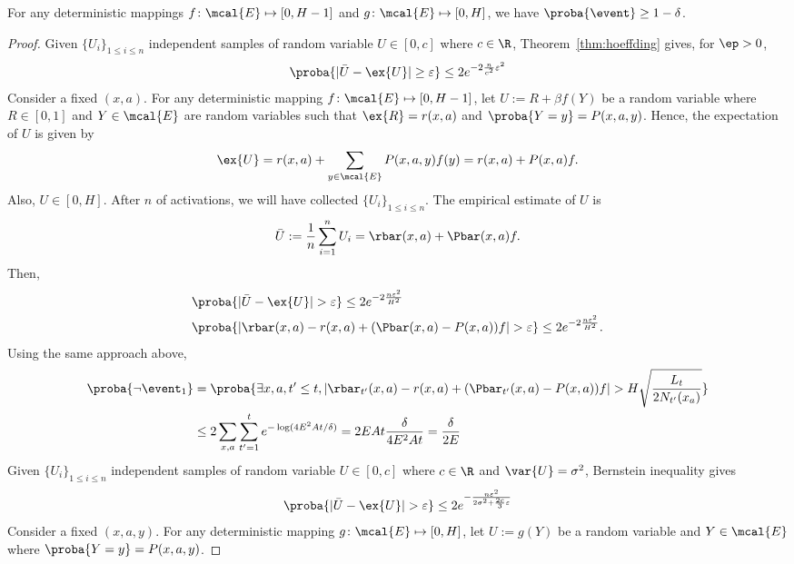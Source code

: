 \begin{lemma}
\label{lem:high_prob}
For any deterministic mappings $f\colon \mcal{E}\mapsto[0,H-1]$ and $g\colon \mcal{E}\mapsto[0,H]$, we have $\proba{\event}\ge1-\delta$.
\end{lemma}
\begin{proof}
Given $\{U_i\}_{1\le i\le n}$ independent samples of random variable $U\in[0, c]$ where $c\in\R$, Theorem~\ref{thm:hoeffding} gives, for $\ep>0$,
\begin{align*}
\proba{|\bar{U}-\ex{U}|\ge \varepsilon} \le 2e^{-2\frac{n}{c^2}\varepsilon^2}
\end{align*}
Consider a fixed $(x,a)$.
For any deterministic mapping $f\colon\mcal{E}\mapsto[0,H-1]$, let $U:=R+\beta f(Y)$ be a random variable where $R\in[0,1]$ and $Y\in\mcal{E}$ are random variables such that $\ex{R}=r(x,a)$ and $\proba{Y=y}=P(x,a,y)$.
Hence, the expectation of $U$ is given by 
\begin{align*}
\ex{U}=r(x,a) +\sum_{y\in\mcal{E}}P(x,a,y)f(y)=r(x,a) +P(x,a)f.
\end{align*}
Also, $U\in [0,H]$.
After $n$ of activations, we will have collected $\{U_i\}_{1\le i\le n}$.
The empirical estimate of $U$ is
$$\bar{U}:=\frac1n\sum_{i=1}^{n} U_i=\rbar(x,a) +\Pbar(x,a)f.$$
Then,
\begin{align*}
&\proba{\vert\bar{U}-\ex{U}\vert >\varepsilon} \le2e^{-2\frac{n\varepsilon^2}{H^2}} \\
&\proba{\vert \rbar(x,a)-r(x,a) +(\Pbar(x,a) -P(x,a))f\vert >\varepsilon} \le2e^{-2\frac{n\varepsilon^2}{H^2}}.
\end{align*}
Using the same approach above,
\begin{align*}
\proba{\neg\event_1} 
&=\proba{\exists x,a, t'\le t,|\rbar_{t'}(x,a)-r(x,a)+(\Pbar_{t'}(x,a)-P(x,a))f| >H\sqrt{\frac{L_t}{2N_{t'}(x_a)}}} \\
&\le2\sum_{x,a} \sum_{t'=1}^{t}e^{-\log(4E^2At/\delta)} =2EAt\frac{\delta}{4E^2At}=\frac{\delta}{2E}
\end{align*}
Given $\{U_i\}_{1\le i\le n}$ independent samples of random variable $U\in[0, c]$ where $c\in\R$ and $\var{U}=\sigma^2$, Bernstein inequality gives
\begin{align*}
\proba{|\bar{U}-\ex{U}|> \varepsilon} \le 2e^{-\frac{n\varepsilon^2}{2\sigma^2+\frac{2c}3\varepsilon}}
\end{align*}
Consider a fixed $(x,a,y)$. For any deterministic mapping $g\colon\mcal{E}\mapsto[0,H]$, let $U:=g(Y)$ be a random variable and $Y\in\mcal{E}$ where $\proba{Y=y}=P(x,a,y)$.

\end{proof}
